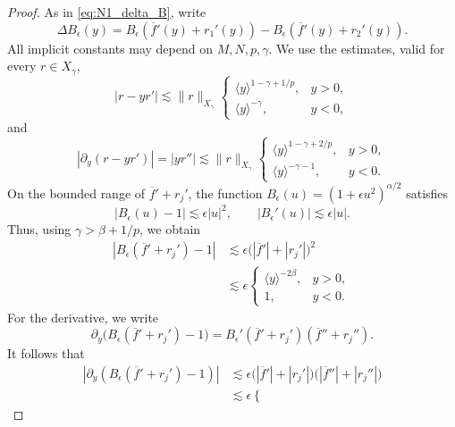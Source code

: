 \documentclass[11pt]{amsart}
\theoremstyle{definition}
\theoremstyle{remark}
\numberwithin{equation}{section}
\newcommand{\ov}[1]{\overline{#1}}
\newcommand{\ang}[1]{\langle #1 \rangle}
\begin{document}
\begin{proof}
    As in \eqref{eq:N1_delta_B}, write
    \[
        \Delta B_\epsilon(y)
        =B_\epsilon(\ov{f}'(y)+r_1'(y))-B_\epsilon(\ov{f}'(y)+r_2'(y)).
    \]
    All implicit constants may depend on $M,N,p,\gamma$.
    We use the estimates, valid for every $r\in X_\gamma$,
    \begin{equation}\label{eq:N2_transport_bound}|r-yr'|\lesssim\|r\|_{X_\gamma}\begin{cases}
        \ang{y}^{1-\gamma+1/p}, & y>0,\\
        \ang{y}^{-\gamma}, & y<0,
    \end{cases}\end{equation}
    and
    \begin{equation}\label{eq:N2_transport_derivative_bound}|\partial_y(r-yr')|=|yr''|\lesssim\|r\|_{X_\gamma}\begin{cases}
        \ang{y}^{1-\gamma+2/p}, & y>0,\\
        \ang{y}^{-\gamma-1}, & y<0.
    \end{cases}\end{equation}
    On the bounded range of $\ov{f}'+r_j'$, the function
    $B_\epsilon(u)=(1+\epsilon u^2)^{\alpha/2}$ satisfies
    \[
        |B_\epsilon(u)-1|\lesssim\epsilon|u|^2,\qquad
        |B_\epsilon'(u)|\lesssim\epsilon|u|.
    \]
    Thus, using $\gamma>\beta+1/p$, we obtain
    \begin{equation}\label{eq:N2_coefficient_bound}
\begin{aligned}
        |B_\epsilon(\ov{f}'+r_j')-1|
        &\lesssim\epsilon\bigl(|\ov{f}'|+|r_j'|\bigr)^2\\
        &\lesssim\epsilon\begin{cases}
            \ang{y}^{-2\beta}, & y>0,\\
            1, & y<0.
        \end{cases}
    \end{aligned}
\end{equation}
    For the derivative, we write
    \[
        \partial_y\bigl(B_\epsilon(\ov{f}'+r_j')-1\bigr)
        =B_\epsilon'(\ov{f}'+r_j')(\ov{f}''+r_j'').
    \]
    It follows that
    \begin{equation}\label{eq:N2_coefficient_derivative_bound}
\begin{aligned}
        |\partial_y(B_\epsilon(\ov{f}'+r_j')-1)|
        &\lesssim\epsilon\bigl(|\ov{f}'|+|r_j'|\bigr)
        \bigl(|\ov{f}''|+|r_j''|\bigr)\\
        &\lesssim\epsilon\begin{cases}

\end{cases}
\end{aligned}
\end{equation}
\end{proof}
\end{document}
